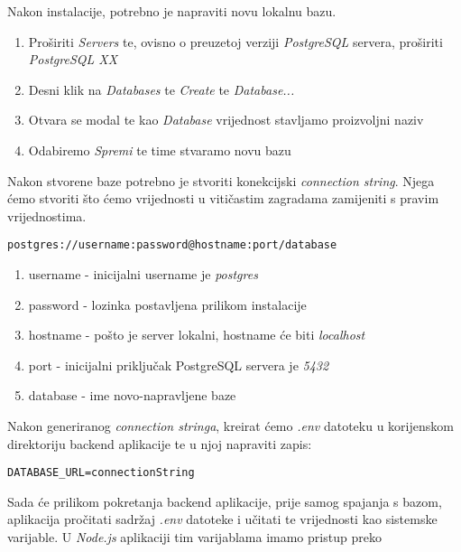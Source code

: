 		        Nakon instalacije, potrebno je napraviti novu lokalnu bazu.
		        
		        \begin{enumerate}
		            \item Proširiti \textit{Servers} te, ovisno o preuzetoj verziji \textit{PostgreSQL} servera, proširiti  \textit{PostgreSQL XX}
		            \item Desni klik na \textit{Databases} te \textit{Create} te \textit{Database...}
		            \item Otvara se modal te kao \textit{Database} vrijednost stavljamo proizvoljni naziv
		            \item Odabiremo \textit{Spremi} te time stvaramo novu bazu
		        \end{enumerate}
		        
		        Nakon stvorene baze potrebno je stvoriti konekcijski \textit{connection string}. Njega ćemo stvoriti što ćemo vrijednosti u vitičastim zagradama zamijeniti s pravim vrijednostima.
		        
		        \begin{center}
	               \texttt{postgres://{username}:{password}@{hostname}:{port}/{database}}
		        \end{center}
		        
		        \begin{enumerate}
		            \item username - inicijalni username je \textit{postgres}
		            \item password - lozinka postavljena prilikom instalacije
		            \item hostname - pošto je server lokalni, hostname će biti \textit{localhost}
		            \item port - inicijalni priključak PostgreSQL servera je \textit{5432}
		            \item database - ime novo-napravljene baze
		        \end{enumerate}
		        
		        Nakon generiranog \textit{connection stringa}, kreirat ćemo \textit{.env} datoteku u korijenskom direktoriju backend aplikacije te u njoj napraviti zapis:

		        \begin{center}
	                \texttt{DATABASE\_URL={connectionString}}
		        \end{center}
		        
		        Sada će prilikom pokretanja backend aplikacije, prije samog spajanja s bazom, aplikacija pročitati sadržaj \textit{.env} datoteke i učitati te vrijednosti kao sistemske varijable. U \textit{Node.js} aplikaciji tim varijablama imamo pristup preko

